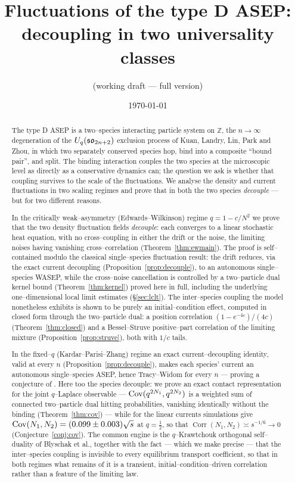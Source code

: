 \documentclass[11pt]{article}
\title{\bf Fluctuations of the type D ASEP:\\
decoupling in two universality classes}
\author{(working draft --- full version)}
\date{\today}
\theoremstyle{plain}
\theoremstyle{definition}
\theoremstyle{remark}
\DeclareMathOperator{\Corr}{Corr}\DeclareMathOperator{\cum}{cum}
\newcommand{\Z}{\mathbb{Z}}\newcommand{\R}{\mathbb{R}}\newcommand{\N}{\mathbb{N}}
\begin{document}
\maketitle

\begin{abstract}
The type D ASEP is a two--species interacting particle system on $\Z$, the
$n\to\infty$ degeneration of the $U_q(\mathfrak{so}_{2n+2})$ exclusion process of Kuan, Landry,
Lin, Park and Zhou, in which two separately conserved species hop, bind into a
composite ``bound pair'', and split. The binding interaction couples the two species
at the microscopic level as directly as a conservative dynamics can; the question we
ask is whether that coupling survives to the scale of the fluctuations. We analyse the
density and current fluctuations in two scaling regimes and prove that in both the two
species \emph{decouple} --- but for two different reasons.

In the critically weak--asymmetry (Edwards--Wilkinson) regime $q=1-c/N^2$ we prove
that the two density fluctuation fields \emph{decouple}: each converges to a linear
stochastic heat equation, with no cross--coupling in either the drift or the noise,
the limiting noises having vanishing cross--correlation (Theorem~\ref{thm:ewmain}).
The proof is self--contained modulo the classical single--species fluctuation result:
the drift reduces, via the exact current decoupling (Proposition~\ref{prop:decouple}),
to an autonomous single--species WASEP, while the cross--noise cancellation is controlled
by a two--particle dual kernel bound
(Theorem~\ref{thm:kernel}) proved here in full, including the underlying
one--dimensional local limit estimates (\S\ref{sec:lclt}). The inter--species coupling the model nonetheless exhibits is
shown to be purely an initial--condition effect, computed in closed form through the
two--particle dual: a position correlation $(1-e^{-4c})/(4c)$ (Theorem~\ref{thm:closed})
and a Bessel--Struve positive--part correlation of the limiting mixture
(Proposition~\ref{prop:struve}), both with $1/c$ tails.

In the fixed--$q$ (Kardar--Parisi--Zhang) regime an exact current--decoupling identity,
valid at every $n$ (Proposition~\ref{prop:decouple}), makes each
species' current an autonomous single--species ASEP, hence Tracy--Widom for every $n$
--- proving a conjecture of \cite{REU}. Here too the species decouple: we prove an
exact contact representation for the joint $q$--Laplace observable ---
$\operatorname{Cov}(q^{2N_1},q^{2N_2})$ is a weighted sum of connected two--particle dual hitting
probabilities, vanishing identically without the binding (Theorem~\ref{thm:cov}) ---
while for the linear currents simulations give
$\operatorname{Cov}(N_1,N_2)=(0.099\pm0.003)\sqrt s$ at $q=\tfrac12$, so that
$\Corr(N_1,N_2)\asymp s^{-1/6}\to0$ (Conjecture~\ref{conj:cov}). The common engine is the $q$--Krawtchouk orthogonal
self--duality of Blyschak et al., together with the fact --- which we make precise --- that the
inter--species coupling is invisible to every equilibrium transport coefficient, so
that in both regimes what remains of it is a transient, initial--condition--driven
correlation rather than a feature of the limiting law.
\end{abstract}
\end{document}
